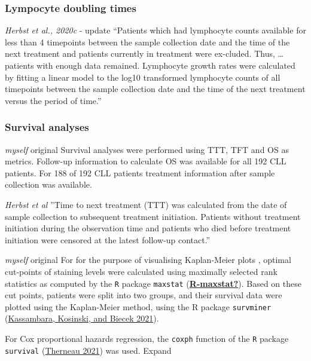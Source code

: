 \documentclass[11pt, a4paper, twosided]{book}
\begin{document}
\hypertarget{lympocyte-doubling-times}{%
\subsubsection{Lympocyte doubling times}\label{lympocyte-doubling-times}}

\emph{Herbst et al., 2020c} - update
``Patients which had lymphocyte counts available for less than 4 timepoints between the sample
collection date and the time of the next treatment and patients currently in treatment were ex-cluded. Thus, \ldots{} patients with enough data remained. Lymphocyte growth rates were calculated by fitting a linear model to the log10 transformed lymphocyte counts of all timepoints between the sample collection date and the time of the next treatment versus the period of time.''

\hypertarget{survival-analyses}{%
\subsubsection{Survival analyses}\label{survival-analyses}}

\emph{myself} original
Survival analyses were performed using TTT, TFT and OS as metrics. Follow-up information to calculate OS was available for all 192 CLL patients. For 188 of 192 CLL patients treatment information after sample collection was available.

\emph{Herbst et al}
''Time to next treatment (TTT) was calculated from the date of sample collection to subsequent
treatment initiation. Patients without treatment initiation during the observation time and
patients who died before treatment initiation were censored at the latest follow-up contact.''

\emph{myself} original
For for the purpose of visualising Kaplan-Meier plots , optimal cut-points of staining levels were calculated using maximally selected rank statistics as computed by the \texttt{R} package \texttt{maxstat} (\protect\hyperlink{ref-R-maxstat}{\textbf{R-maxstat?}}). Based on these cut points, patients were split into two groups, and their survival data were plotted using the Kaplan-Meier method, using the R package \texttt{survminer} (\protect\hyperlink{ref-R-survminer}{Kassambara, Kosinski, and Biecek 2021}).

For Cox proportional hazards regression, the \texttt{coxph} function of the \texttt{R} package \texttt{survival} (\protect\hyperlink{ref-R-survival}{Therneau 2021}) was used. Expand
\end{document}
